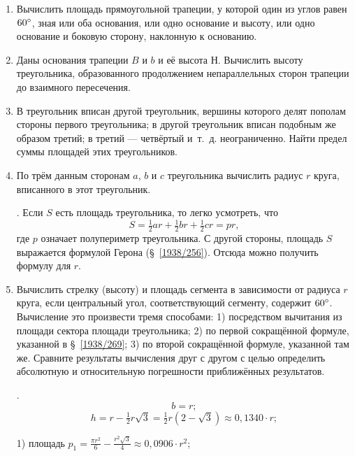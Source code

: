 {\begin{enumerate}[noitemsep]
\end{enumerate}

\begin{center}
\end{center}

\begin{enumerate}


\item
Вычислить площадь прямоугольной трапеции, у которой один из углов равен $60\degree$, зная или оба основания, или одно основание и высоту, или одно основание и боковую сторону, наклонную к основанию.

\item
Даны основания трапеции $B$ и $b$ и её высота Н.
Вычислить высоту треугольника, образованного продолжением непараллельных сторон трапеции до взаимного пересечения.

\item
В треугольник вписан другой треугольник, вершины которого делят пополам стороны первого треугольника;
в другой треугольник вписан подобным же образом третий;
в третий — четвёртый и~т.~д.
неограниченно.
Найти предел суммы площадей этих треугольников.

\item
По трём данным сторонам $a$, $b$ и $c$ треугольника вычислить радиус $r$ круга, вписанного в этот треугольник.

\smallskip
{}.
Если $S$ есть площадь треугольника, то легко усмотреть, что
\[S=\tfrac12 ar+\tfrac12 br+\tfrac12 cr=pr,\]
где $p$ означает полупериметр треугольника.
С другой стороны, площадь $S$ выражается формулой Герона (§~\ref{1938/256}).
Отсюда можно получить формулу для $r$.


\item
Вычислить стрелку (высоту) и площадь сегмента в зависимости от радиуса $r$ круга, если центральный угол, соответствующий сегменту, содержит $60\degree$.
Вычисление это произвести тремя способами:
1) посредством вычитания из площади сектора площади треугольника;
2) по первой сокращённой формуле, указанной в §~\ref{1938/269};
3) по второй сокращённой формуле, указанной там же.
Сравните результаты вычисления друг с другом с целью определить абсолютную и относительную погрешности приближённых результатов.

\smallskip
{}.
\[b=r;\]
\[h=r-\tfrac12 r\sqrt3=\tfrac12 r(2-\sqrt3)\approx 0{,}1340\cdot r;\]

1) площадь $p_1=\frac{\pi r^2}{6}-\frac{r^2\sqrt3}{4}\approx 0{,}0906\cdot r^2$;


\end{enumerate}}
